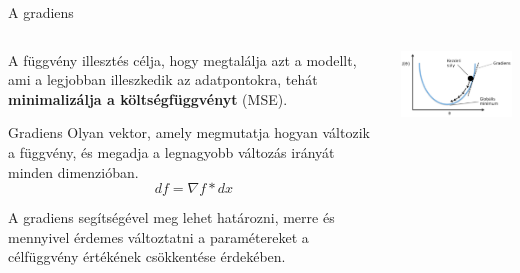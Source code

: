 \documentclass[english, aspectratio=169]{beamer}
\begin{document}
\begin{frame}{A gradiens}
\begin{columns}
\begin{column}{.5\textwidth}
A függvény illesztés célja, hogy megtalálja azt a modellt, ami a legjobban illeszkedik az adatpontokra, tehát \textbf{minimalizálja a költségfüggvényt} (MSE). 
\begin{block}{Gradiens}
Olyan vektor, amely megmutatja hogyan változik a függvény, és megadja a legnagyobb változás irányát minden dimenzióban.
\vspace{-0.25cm}
\[
df = \nabla f * dx
\]
\end{block} 
A gradiens segítségével meg lehet határozni, merre és mennyivel érdemes változtatni a paramétereket a célfüggvény értékének csökkentése érdekében.
\end{column}
\begin{column}{.5\textwidth}
\begin{center}
\includegraphics[width=7.5cm, keepaspectratio]{images/ql_12.png}
\end{center}
\end{column}
\end{columns}
\end{frame}
\end{document}
